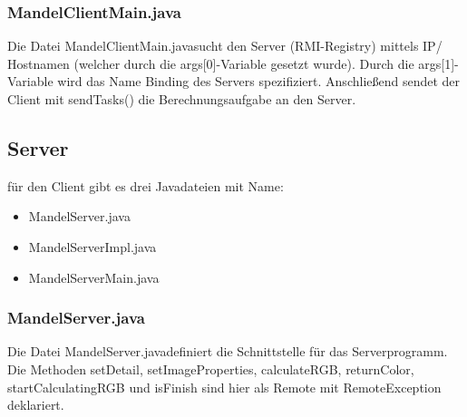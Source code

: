 \documentclass{article}
\begin{document}
	\newpage
	\subsubsection{MandelClientMain.java}
	Die Datei \glqq MandelClientMain.java\grqq sucht den Server (RMI-Registry) mittels IP/ Hostnamen (welcher durch die args[0]-Variable gesetzt wurde). Durch die args[1]-Variable wird das Name Binding des Servers spezifiziert. Anschließend sendet der Client mit sendTasks() die Berechnungsaufgabe an den Server.
	

	\newpage
	\subsection{Server}
	für den Client gibt es drei Javadateien mit Name:
	\begin{itemize}
		\item MandelServer.java
		\item MandelServerImpl.java
		\item MandelServerMain.java
	\end{itemize}
	
	\subsubsection{MandelServer.java}
	Die Datei \glqq MandelServer.java\grqq definiert die Schnittstelle für das Serverprogramm. Die Methoden setDetail, setImageProperties, calculateRGB, returnColor, startCalculatingRGB und isFinish sind hier als Remote mit RemoteException deklariert.
	
	
	\newpage	
\end{document}
